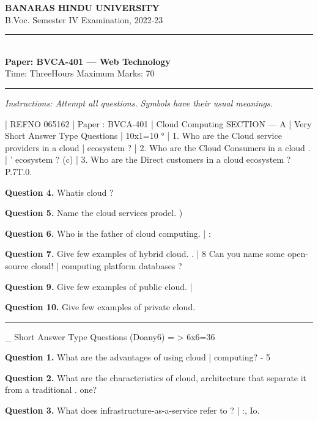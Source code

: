 \documentclass[11pt,a4paper]{article}
\begin{document}
\begin{center}
  {\large\bfseries BANARAS HINDU UNIVERSITY}\\[2pt]
  {\normalsize B.Voc. Semester IV Examination, 2022-23}\\[6pt]
  \rule{0.8\linewidth}{0.5pt}\\[6pt]
  {\large\bfseries Paper: BVCA-401 --- Web Technology}\\[4pt]
  {\normalsize Time: ThreeHours \hfill Maximum Marks: 70}
\end{center}

\rule{\linewidth}{0.4pt}

\smallskip
\noindent\textit{Instructions: Attempt all questions. Symbols have their usual meanings.}

\bigskip

| REFNO 065162
| Paper : BVCA-401
| Cloud Computing
SECTION --- A
| Very Short Answer Type Questions
| 10x1=10 °
| 1. Who are the Cloud service providers in a cloud |
ecosystem ?
| 2. Who are the Cloud Consumers in a cloud .
| ' ecosystem ? (c)
| 3. Who are the Direct customers in a cloud
ecosystem ?
P.7T.0.

\medskip\noindent\textbf{Question 4.} Whatis cloud ?

\medskip\noindent\textbf{Question 5.} Name the cloud services prodel. )

\medskip\noindent\textbf{Question 6.} Who is the father of cloud computing. | :

\medskip\noindent\textbf{Question 7.} Give few examples of hybrid cloud. . |
8 Can you name some open-source cloud! |
computing platform databases ?

\medskip\noindent\textbf{Question 9.} Give few examples of public cloud. |

\medskip\noindent\textbf{Question 10.} Give few examples of private cloud.

\bigskip{}
\rule{\linewidth}{0.4pt}\smallskip

\_ Short Answer Type Questions (Doany6) = >
6x6=36

\medskip\noindent\textbf{Question 1.} What are the advantages of using cloud |
computing? - 5

\medskip\noindent\textbf{Question 2.} What are the characteristics of cloud,
architecture that separate it from a traditional
. one?

\medskip\noindent\textbf{Question 3.} What does infrastructure-as-a-service refer to ? |
:, Io.
\end{document}
